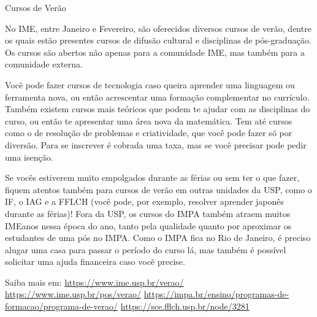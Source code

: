 \begin{secao}{Cursos de Verão}

No IME, entre Janeiro e Fevereiro, são oferecidos diversos cursos de verão,
dentre os quais estão presentes cursos de difusão cultural e disciplinas de
pós-graduação. Os cursos são abertos não apenas para a comunidade IME, mas
também para a comunidade externa.

Você pode fazer cursos de tecnologia caso queira aprender uma linguagem ou ferramenta nova, 
ou então acrescentar uma formação complementar no currículo. Também existem cursos mais teóricos 
que podem te ajudar com as disciplinas do curso, ou então te apresentar uma área nova da matemática. 
Tem até cursos como o de resolução de problemas e criatividade, que você pode fazer só por diversão. 
Para se inscrever é cobrada uma taxa, mas se você precisar pode pedir uma isenção. 

Se vocês estiverem muito empolgados durante as férias ou sem ter o que fazer, fiquem atentos também para 
cursos de verão em outras unidades da USP, como o IF, o IAG e a FFLCH (você pode, por exemplo, resolver aprender 
japonês durante as férias)! Fora da USP, os cursos do IMPA também atraem muitos IMEanos nessa época do ano, tanto 
pela qualidade quanto por aproximar os estudantes de uma pós no IMPA. Como o IMPA fica no Rio de Janeiro, é preciso 
alugar uma casa para passar o período do curso lá, mas também é possível solicitar uma ajuda financeira caso vocẽ precise.


Saiba mais em: 
\url{https://www.ime.usp.br/verao/}
\url{https://www.ime.usp.br/pos/verao/}
\url{https://impa.br/ensino/programas-de-formacao/programa-de-verao/}
\url{https://sce.fflch.usp.br/node/3281}

\end{secao}
